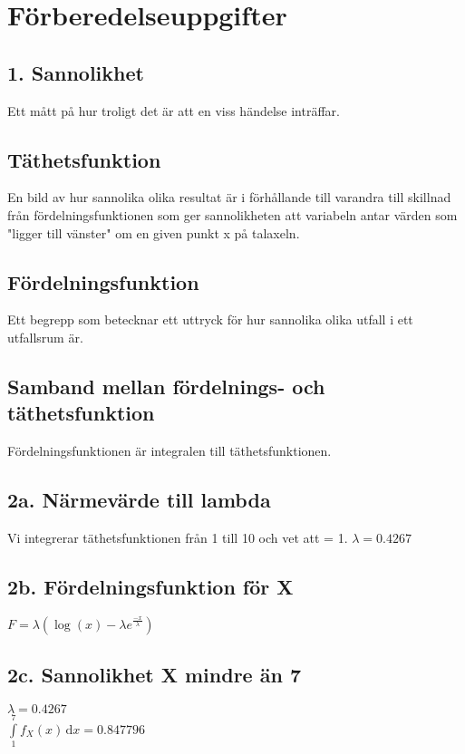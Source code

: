 \documentclass{article}
\begin{document}
\section*{Förberedelseuppgifter}

\subsection*{1. Sannolikhet}

Ett mått på hur troligt det är att en viss händelse inträffar.

\subsection*{Täthetsfunktion}

En bild av hur sannolika olika resultat är i förhållande till varandra till
skillnad från fördelningsfunktionen som ger sannolikheten att variabeln antar
värden som "ligger till vänster" om en given punkt x på talaxeln.

\subsection*{Fördelningsfunktion}

Ett begrepp som betecknar ett uttryck för hur sannolika olika utfall i ett
utfallsrum är.

\subsection*{Samband mellan fördelnings- och täthetsfunktion}

Fördelningsfunktionen är integralen till täthetsfunktionen.

\subsection*{2a. Närmevärde till lambda}
Vi integrerar täthetsfunktionen från 1 till 10 och vet att = 1.
$\lambda = 0.4267$
\subsection*{2b. Fördelningsfunktion för X}
$F = \lambda(\log(x)-\lambda e^{\frac{-x}{\lambda}})$
\subsection*{2c. Sannolikhet X mindre än 7}
$\lambda = 0.4267$ \\
$\int \limits_1^{7} f_X(x)  \, \mathrm{d}x = 0.847796$
\end{document}
